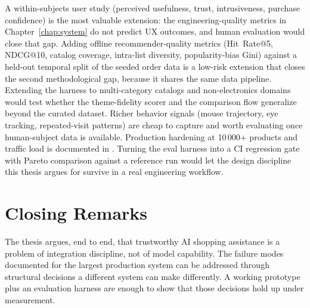 A within-subjects user study (perceived usefulness, trust,
intrusiveness, purchase confidence) is the most valuable
extension: the engineering-quality metrics in
Chapter~\ref{chap:system} do not predict UX outcomes, and human
evaluation would close that gap. Adding offline
recommender-quality metrics (Hit~Rate@5, NDCG@10, catalog
coverage, intra-list diversity, popularity-bias Gini) against a
held-out temporal split of the seeded order data is a low-risk
extension that closes the second methodological gap, because it
shares the same data pipeline. Extending the harness to
multi-category catalogs and non-electronics domains would test
whether the theme-fidelity scorer and the comparison flow
generalize beyond the curated dataset. Richer behavior signals
(mouse trajectory, eye tracking, repeated-visit patterns) are
cheap to capture and worth evaluating once human-subject data is
available. Production hardening at 10\,000+ products and traffic
load is documented in .
Turning the eval harness into a CI regression gate with Pareto
comparison against a reference run would let the design
discipline this thesis argues for survive in a real engineering
workflow.

\section{Closing Remarks}
\label{sec:concl-closing}

The thesis argues, end to end, that trustworthy AI shopping
assistance is a problem of integration discipline, not of model
capability. The failure modes documented for the largest
production system can be addressed through structural decisions
a different system can make differently. A working prototype
plus an evaluation harness are enough to show that those
decisions hold up under measurement.
